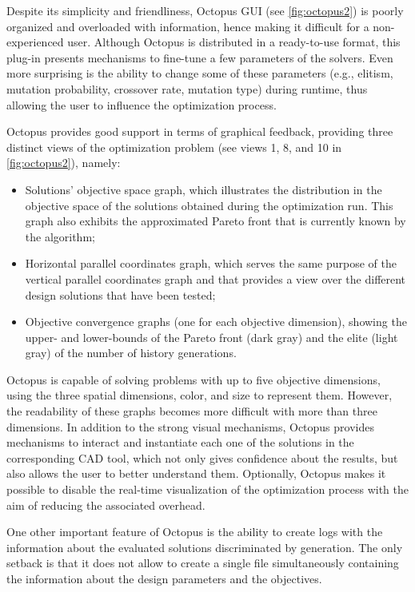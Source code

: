 	Despite its simplicity and friendliness, Octopus \ac{GUI} (see \cref{fig:octopus2}) is poorly organized and overloaded with information, hence making it difficult for a non-experienced user. Although Octopus is distributed in a ready-to-use format, this plug-in presents mechanisms to fine-tune a few parameters of the solvers. Even more surprising is the ability to change some of these parameters (e.g., elitism, mutation probability, crossover rate, mutation type) during runtime, thus allowing the user to influence the optimization process.
	
	Octopus provides good support in terms of graphical feedback, providing three distinct views of the optimization problem (see views 1, 8, and 10 in \cref{fig:octopus2}), namely:
	\begin{itemize}
		\item Solutions' objective space graph, which illustrates the distribution in the objective space of the solutions obtained during the optimization run. This graph also exhibits the approximated Pareto front that is currently known by the algorithm;
		\item Horizontal parallel coordinates graph, which serves the same purpose of the vertical parallel coordinates graph and that provides a view over the different design solutions that have been tested;
		\item Objective convergence graphs (one for each objective dimension), showing the upper- and lower-bounds of the Pareto front (dark gray) and the elite (light gray) of the number of history generations.
	\end{itemize} 
	
	Octopus is capable of solving problems with up to five objective dimensions, using the three spatial dimensions, color, and size to represent them. However, the readability of these graphs becomes more difficult with more than three dimensions. In addition to the strong visual mechanisms, Octopus provides mechanisms to interact and instantiate each one of the solutions in the corresponding \ac{CAD} tool, which not only gives confidence about the results, but also allows the user to better understand them. Optionally, Octopus makes it possible to disable the real-time visualization of the optimization process with the aim of reducing the associated overhead.
	
	One other important feature of Octopus is the ability to create logs with the information about the evaluated solutions discriminated by generation. The only setback is that it does not allow to create a single file simultaneously containing the information about the design parameters and the objectives. 
	
